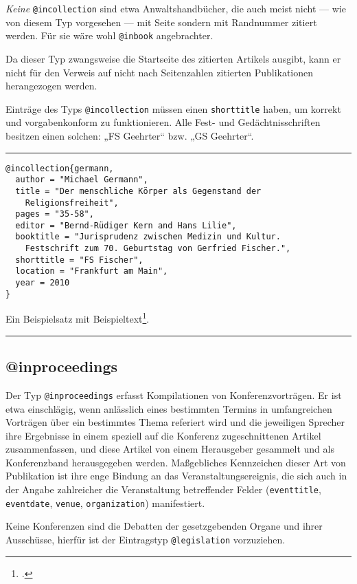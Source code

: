 \documentclass[11pt,a4paper,DIV=calc,draft]{scrartcl}
\newenvironment{rubexample}{\par\vspace{\baselineskip}\hrule\par\begin{refsection}}{\end{refsection}\par\hrule\par\vspace{\baselineskip}}
\begin{document}
\emph{Keine} \verb+@incollection+ sind etwa Anwaltshandbücher, die
auch meist nicht — wie von diesem Typ vorgesehen — mit Seite sondern
mit Randnummer zitiert werden. Für sie wäre wohl \verb+@inbook+
angebrachter.

Da dieser Typ zwangsweise die Startseite des zitierten Artikels
ausgibt, kann er nicht für den Verweis auf nicht nach Seitenzahlen
zitierten Publikationen herangezogen werden.

Einträge des Typs \verb+@incollection+ müssen einen \verb+shorttitle+
haben, um korrekt und vorgabenkonform zu funktionieren. Alle Fest- und
Gedächtnisschriften besitzen einen solchen: „FS Geehrter“ bzw. „GS
Geehrter“.

\begin{rubexample}
\begin{verbatim}
@incollection{germann,
  author = "Michael Germann",
  title = "Der menschliche Körper als Gegenstand der
    Religionsfreiheit",
  pages = "35-58",
  editor = "Bernd-Rüdiger Kern and Hans Lilie",
  booktitle = "Jurisprudenz zwischen Medizin und Kultur.
    Festschrift zum 70. Geburtstag von Gerfried Fischer.",
  shorttitle = "FS Fischer",
  location = "Frankfurt am Main",
  year = 2010
}
\end{verbatim}

Ein Beispielsatz mit Beispieltext\footcite[41]{germann}.

\printbibliography
\end{rubexample}

\subsection{@inproceedings}

Der Typ \verb+@inproceedings+ erfasst Kompilationen von
Konferenzvorträgen. Er ist etwa einschlägig, wenn anlässlich eines
bestimmten Termins in umfangreichen Vorträgen über ein bestimmtes
Thema referiert wird und die jeweiligen Sprecher ihre Ergebnisse in
einem speziell auf die Konferenz zugeschnittenen Artikel
zusammenfassen, und diese Artikel von einem Herausgeber gesammelt und
als Konferenzband herausgegeben werden. Maßgebliches Kennzeichen
dieser Art von Publikation ist ihre enge Bindung an das
Veranstaltungsereignis, die sich auch in der Angabe zahlreicher die
Veranstaltung betreffender Felder (\verb+eventtitle+,
\verb+eventdate+, \verb+venue+, \verb+organization+) manifestiert.

Keine Konferenzen sind die Debatten der gesetzgebenden Organe und
ihrer Ausschüsse, hierfür ist der Eintragstyp \verb+@legislation+
vorzuziehen.
\end{document}
